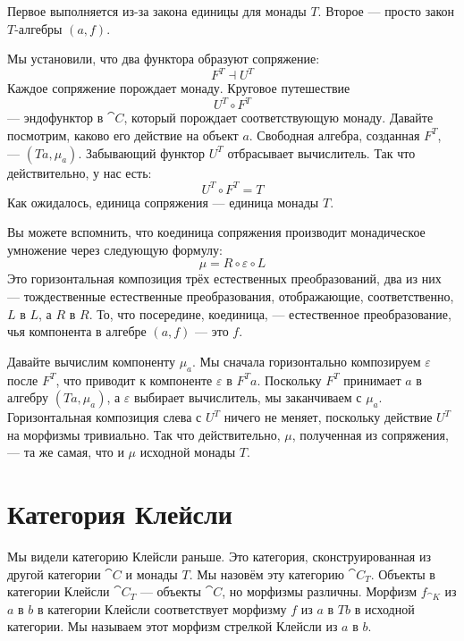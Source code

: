 \noindent
Первое выполняется из-за закона единицы для монады $T$.
Второе --- просто закон $T$-алгебры $(a, f)$.

Мы установили, что два функтора образуют сопряжение:
\[F^T \dashv U^T\]
Каждое сопряжение порождает монаду. Круговое путешествие
\[U^T \circ F^T\]
--- эндофунктор в $\cat{C}$, который порождает соответствующую монаду.
Давайте посмотрим, каково его действие на объект $a$. Свободная алгебра,
созданная $F^T$, --- $(T a, \mu_a)$. Забывающий функтор
$U^T$ отбрасывает вычислитель. Так что действительно, у нас есть:
\[U^T \circ F^T = T\]
Как ожидалось, единица сопряжения --- единица монады $T$.

Вы можете вспомнить, что коединица сопряжения производит монадическое
умножение через следующую формулу:
\[\mu = R \circ \varepsilon \circ L\]
Это горизонтальная композиция трёх естественных преобразований, два
из них --- тождественные естественные преобразования, отображающие, соответственно,
$L$ в $L$, а $R$ в $R$. То, что
посередине, коединица, --- естественное преобразование, чья компонента в
алгебре $(a, f)$ --- это $f$.

Давайте вычислим компоненту $\mu_a$. Мы сначала горизонтально композируем
$\varepsilon$ после $F^T$, что приводит к компоненте
$\varepsilon$ в $F^T a$. Поскольку $F^T$ принимает $a$ в
алгебру $(T a, \mu_a)$, а $\varepsilon$ выбирает вычислитель, мы заканчиваем
с $\mu_a$. Горизонтальная композиция слева с $U^T$
ничего не меняет, поскольку действие $U^T$ на морфизмы
тривиально. Так что действительно, $\mu$, полученная из сопряжения, --- та же
самая, что и $\mu$ исходной монады $T$.

\section{Категория Клейсли}

Мы видели категорию Клейсли раньше. Это категория, сконструированная из
другой категории $\cat{C}$ и монады $T$. Мы назовём эту
категорию $\cat{C}_T$. Объекты в категории Клейсли
$\cat{C}_T$ --- объекты $\cat{C}$, но морфизмы
различны. Морфизм $f_{\cat{K}}$ из $a$ в $b$ в
категории Клейсли соответствует морфизму $f$ из
$a$ в $T b$ в исходной категории. Мы называем этот
морфизм стрелкой Клейсли из $a$ в $b$.

